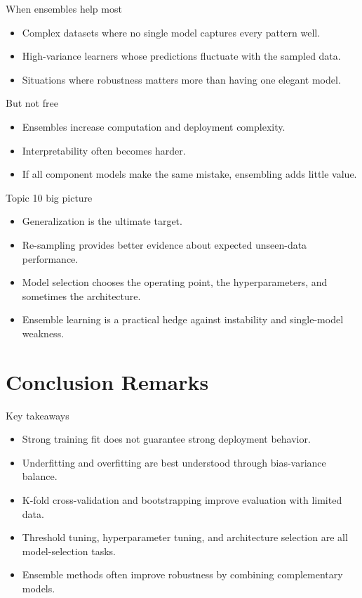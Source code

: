 \documentclass[12pt]{beamer}
\begin{document}
\begin{frame}{When ensembles help most}
  \begin{itemize}
    \item Complex datasets where no single model captures every pattern well.
    \item High-variance learners whose predictions fluctuate with the sampled data.
    \item Situations where robustness matters more than having one elegant model.
  \end{itemize}
  \begin{warningbox}{But not free}
    \begin{itemize}
      \item Ensembles increase computation and deployment complexity.
      \item Interpretability often becomes harder.
      \item If all component models make the same mistake, ensembling adds little value.
    \end{itemize}
  \end{warningbox}
\end{frame}

\begin{frame}{Topic 10 big picture}
  \begin{itemize}
    \item Generalization is the ultimate target.
    \item Re-sampling provides better evidence about expected unseen-data performance.
    \item Model selection chooses the operating point, the hyperparameters, and sometimes the architecture.
    \item Ensemble learning is a practical hedge against instability and single-model weakness.
  \end{itemize}
\end{frame}

\section{Conclusion Remarks}

\begin{frame}{Key takeaways}
  \begin{itemize}
    \item Strong training fit does not guarantee strong deployment behavior.
    \item Underfitting and overfitting are best understood through bias-variance balance.
    \item K-fold cross-validation and bootstrapping improve evaluation with limited data.
    \item Threshold tuning, hyperparameter tuning, and architecture selection are all model-selection tasks.
    \item Ensemble methods often improve robustness by combining complementary models.
  \end{itemize}
\end{frame}
\end{document}
